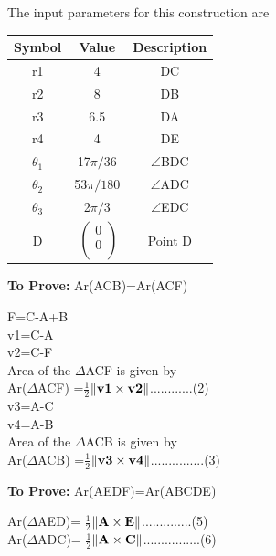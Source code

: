 \documentclass[10pt, a4paper]{article}
\newcommand{\myvec}[1]{\ensuremath{\begin{pmatrix}#1\end{pmatrix}}}
\let\vec\mathbf
\begin{document}
The input parameters for this construction are 
\begin{center}
\begin{tabular}{|c|c|c|}
	\hline
	\textbf{Symbol}&\textbf{Value}&\textbf{Description}\\
	\hline
	r1&4&DC\\
	\hline
	r2&8&DB\\
	\hline
	r3&6.5&DA\\
	\hline
	r4&4&DE\\
	\hline
	${\theta}_1$& 17$\pi/36$&$ \angle $BDC\\ 
	\hline
	${\theta}_2$& 53$\pi/180$&$ \angle $ADC\\ 
	\hline
	${\theta}_3$& 2$\pi/3$&$ \angle $EDC\\ 
	\hline
	D&$\
	\begin{pmatrix}
		0 \\
		0 \\
	\end{pmatrix}$%
	&Point D\\
	
	\hline
\end{tabular}
\end{center}
\textbf{To Prove:} Ar(ACB)=Ar(ACF)
		\begin{center}
	F=C-A+B\\
	v1=C-A\\
	v2=C-F\\
	Area of the $\Delta$ACF is given by \\
Ar($\Delta$ACF) =$\frac{1}{2}$$\norm{\vec{v1}\times\vec{v2}}$............(2)\\
v3=A-C\\
	v4=A-B\\
		Area of the $\Delta$ACB is given by \\
 Ar($\Delta$ACB) =$\frac{1}{2}$$\norm{\vec{v3}\times\vec{v4}}$...............(3)
	\end{center}
	\textbf{To Prove:}  Ar(AEDF)=Ar(ABCDE) 
	\begin{center}
	Ar($\Delta$AED)= 	$\frac{1}{2}$$\norm{\vec{A}\times\vec{E}}$..............(5)\\
	Ar($\Delta$ADC)= $\frac{1}{2}$$\norm{\vec{A}\times\vec{C}}$................(6)\\
	\end{center}
\end{document}
